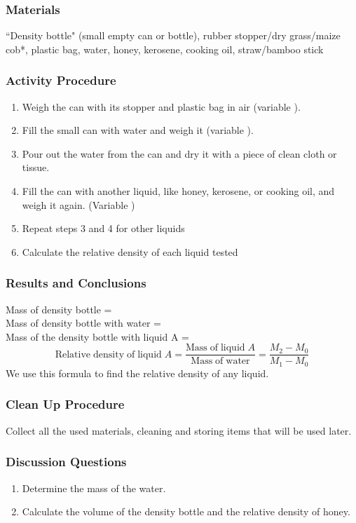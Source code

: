 \subsubsection*{Materials}
``Density bottle" (small empty can or bottle), rubber stopper/dry grass/maize cob*, plastic bag, water, honey, kerosene, cooking oil, straw/bamboo stick


\subsubsection*{Activity Procedure}
\begin{enumerate}
\item{Weigh the can with its stopper and plastic bag in air (variable ).} 
\item{Fill the small can with water and weigh it (variable ).} 
\item{Pour out the water from the can and dry it with a piece of clean cloth or tissue.} 
\item{Fill the can with another liquid, like honey, kerosene, or cooking oil, and weigh it again. (Variable )}
\item{Repeat steps 3 and 4 for other liquids}
\item Calculate the relative density of each liquid tested
\end{enumerate}

\subsubsection*{Results and Conclusions}
Mass of density bottle = \\
Mass of density bottle with water = \\
Mass of the density bottle with liquid A = \\
$$\mathrm{Relative \;density \;of \;liquid \;}A = \frac{\mathrm{Mass \;of \;liquid \;}A}{\mathrm{Mass \;of \;water}} = \frac{M_2-M_0}{M_1-M_0}$$
We use this formula to find the relative density of any liquid.

\subsubsection*{Clean Up Procedure}
Collect all the used materials, cleaning and storing items that will be used later.

\subsubsection*{Discussion Questions}
\begin{enumerate}
\item{Determine the mass of the water.} 
\item{Calculate the volume of the density bottle and the relative density of honey.} 
\end{enumerate}

